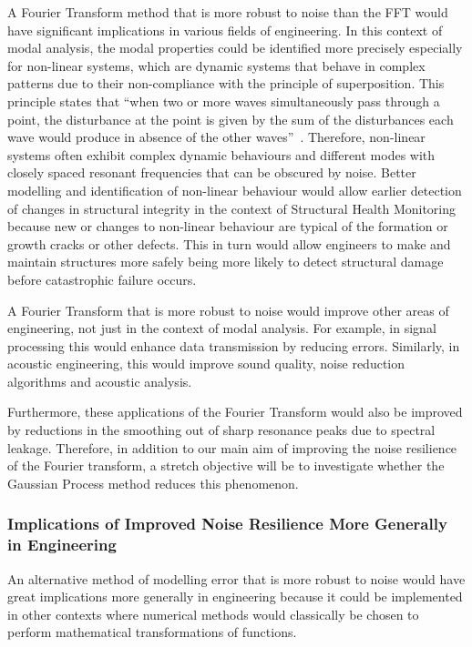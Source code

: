 \documentclass[12pt]{article}
\begin{document}
    A Fourier Transform method that is more robust to noise than the FFT would have significant implications in various fields of engineering.
    In this context of modal analysis, the modal properties could be identified more precisely especially for non-linear systems, which are dynamic systems that behave in complex patterns due to their non-compliance with the principle of superposition.
    This principle states that ``when two or more waves simultaneously pass through a point, the disturbance at the point is given by the sum of the disturbances each wave would produce in absence of the other waves''~\cite{StudyComSuperposition}.
    Therefore, non-linear systems often exhibit complex dynamic behaviours and different modes with closely spaced resonant frequencies that can be obscured by noise.
    Better modelling and identification of non-linear behaviour would allow earlier detection of changes in structural integrity in the context of Structural Health Monitoring because new or changes to non-linear behaviour are typical of the formation or growth cracks or other defects.
    This in turn would allow engineers to make and maintain structures more safely being more likely to detect structural damage before catastrophic failure occurs.

    A Fourier Transform that is more robust to noise would improve other areas of engineering, not just in the context of modal analysis.
    For example, in signal processing this would enhance data transmission by reducing errors.
    Similarly, in acoustic engineering, this would improve sound quality, noise reduction algorithms and acoustic analysis.

    Furthermore, these applications of the Fourier Transform would also be improved by reductions in the smoothing out of sharp resonance peaks due to spectral leakage.
    Therefore, in addition to our main aim of improving the noise resilience of the Fourier transform, a stretch objective will be to investigate whether the Gaussian Process method reduces this phenomenon.

    \subsubsection{Implications of Improved Noise Resilience More Generally in Engineering}

    An alternative method of modelling error that is more robust to noise would have great implications more generally in engineering because it could be implemented in other contexts where numerical methods would classically be chosen to perform mathematical transformations of functions.
\end{document}
